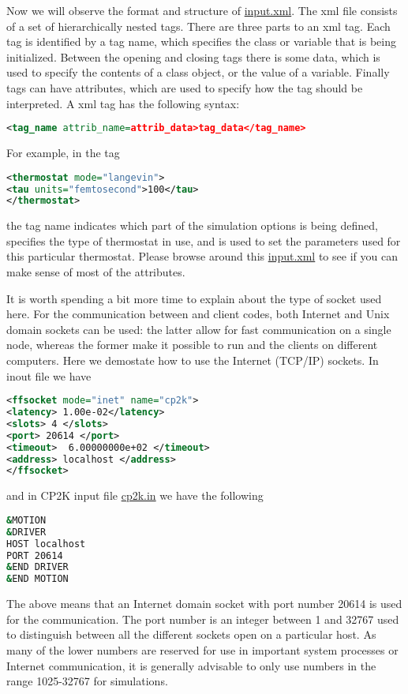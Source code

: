 \documentclass{article}
\begin{document}
\begin{Exercise}[label={inputs},title={Keywords, outputs, and units of \ipi{}}]
\Question
Now we will observe the format and structure of \url{input.xml}.
The xml file consists of a set of hierarchically nested tags. There are three
parts to an xml tag. Each tag is identified by a tag name, which specifies the class
or variable that is being initialized. Between the opening and closing tags there is some data, 
which is used to specify the
contents of a class object, or the value of a variable. Finally tags can have attributes,
which are used to specify how the tag should be interpreted.
A xml tag has the following syntax:
\begin{lstlisting}[language=xml]
<tag_name attrib_name=attrib_data>tag_data</tag_name>
\end{lstlisting}
For example, in the tag
\begin{lstlisting}[language=xml]
<thermostat mode="langevin">
<tau units="femtosecond">100</tau> 
</thermostat>
\end{lstlisting}
the tag name  indicates which part of the simulation options is being defined,
 specifies the type of thermostat in use,
and  is used to set the parameters used for this particular thermostat.
Please browse around this \url{input.xml} to see if you can make sense of most of the attributes.

\Question
It is worth spending a bit more time to explain about the type of socket used here.
For the communication between \ipi{} and client codes, both Internet and Unix domain sockets can be used: the
latter allow for fast communication on a single node, whereas the former make it possible
to run \ipi{} and the clients on different computers.
Here we demostate how to use the Internet (TCP/IP) sockets.
In \ipi{} inout file we have
\begin{lstlisting}[language=xml]
<ffsocket mode="inet" name="cp2k">
<latency> 1.00e-02</latency>
<slots> 4 </slots>
<port> 20614 </port>
<timeout>  6.00000000e+02 </timeout>
<address> localhost </address>
</ffsocket> 
\end{lstlisting}
and in CP2K input file \url{cp2k.in} we have the following
\begin{lstlisting}[language=bash]
&MOTION
&DRIVER
HOST localhost
PORT 20614
&END DRIVER
&END MOTION
\end{lstlisting}
The above means that an Internet domain socket with port number 20614 is used for the communication.
The port number is an integer between 1 and 32767 used to distinguish between all the
different sockets open on a particular host. As many of the lower numbers are reserved
for use in important system processes or Internet communication, it is generally advisable
to only use numbers in the range 1025-32767 for simulations.


\end{Exercise}
\end{document}
